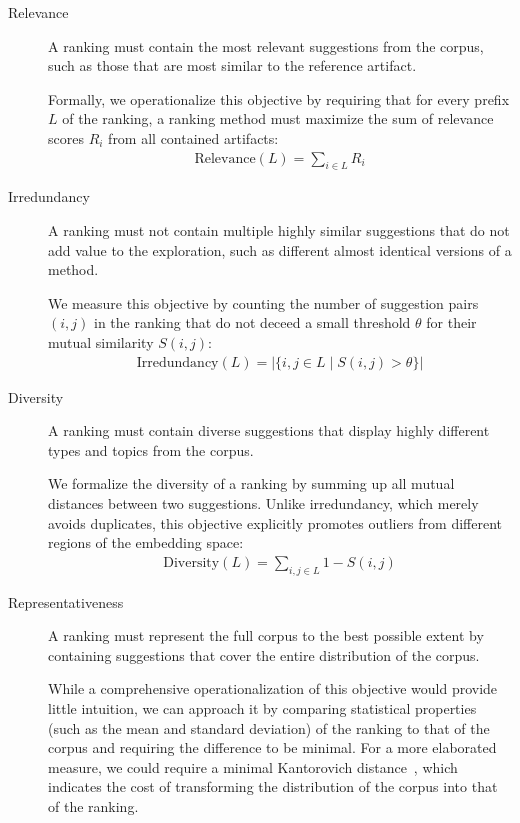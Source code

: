 \begin{description}
	\item[Relevance]
	A ranking must contain the most relevant suggestions from the corpus, such as those that are most similar to the reference artifact.

	Formally, we operationalize this objective by requiring that for every prefix $L$ of the ranking, a ranking method must maximize the sum of relevance scores $R_i$ from all contained artifacts:
	\begin{align}
		\text{Relevance}(L) = \sum_{i \in L} R_i
	\end{align}

	\item[Irredundancy]
	A ranking must not contain multiple highly similar suggestions that do not add value to the exploration, such as different almost identical versions of a method.

	We measure this objective by counting the number of suggestion pairs $(i, j)$ in the ranking that do not deceed a small threshold $\theta$ for their mutual similarity $S(i, j)$:
	\begin{align}
		\text{Irredundancy}(L) = | \{ i, j \in L \mid S(i, j) > \theta \} |
	\end{align}

	\item[Diversity]
	A ranking must contain diverse suggestions that display highly different types and topics from the corpus.

	We formalize the diversity of a ranking by summing up all mutual distances between two suggestions.
	Unlike irredundancy, which merely avoids duplicates, this objective explicitly promotes outliers from different regions of the embedding space:
	\begin{align}
		\text{Diversity}(L) = \sum_{i, j \in L} 1 - S(i, j)
	\end{align}

	\item[Representativeness]
	A ranking must represent the full corpus to the best possible extent by containing suggestions that cover the entire distribution of the corpus.

	While a comprehensive operationalization of this objective would provide little intuition, we can approach it by comparing statistical properties (such as the mean and standard deviation) of the ranking to that of the corpus and requiring the difference to be minimal.
	For a more elaborated measure, we could require a minimal Kantorovich distance~\cite{vaserstein1969markov}, which indicates the cost of transforming the distribution of the corpus into that of the ranking.
\end{description}

